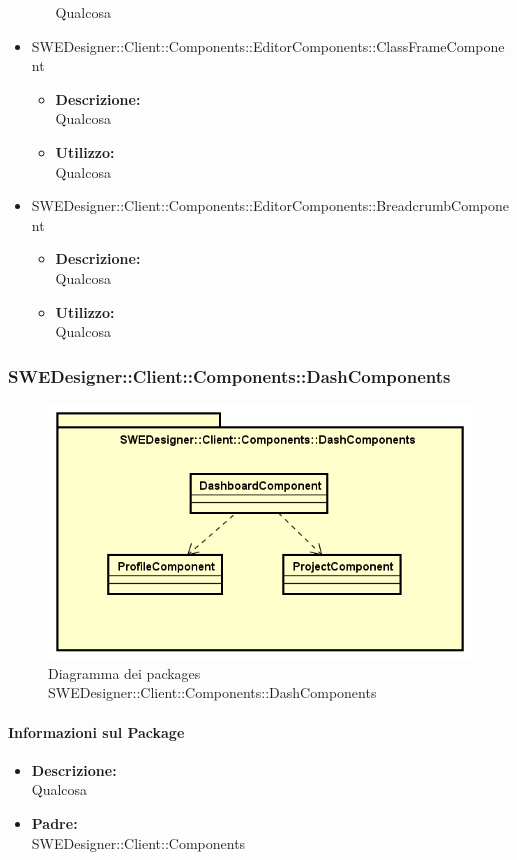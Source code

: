 \begin{itemize}
\begin{itemize}
				Qualcosa
			\end{itemize}
			\item SWEDesigner::Client::Components::EditorComponents::ClassFrameComponent
			\begin{itemize}
				\item \textbf{Descrizione: }\\
				Qualcosa
				\item \textbf{Utilizzo: }\\
				Qualcosa
			\end{itemize}
			\item SWEDesigner::Client::Components::EditorComponents::BreadcrumbComponent
			\begin{itemize}
				\item \textbf{Descrizione: }\\
				Qualcosa
				\item \textbf{Utilizzo: }\\
				Qualcosa
			\end{itemize}
			\end{itemize}
			
		\subsubsection{SWEDesigner::Client::Components::DashComponents}
		 \begin{figure}[h!]
		\centering
		\includegraphics[scale=0.4]{Disegnetti/SWEDesigner__Client__Components__DashComponents.png}
		\caption{Diagramma dei packages SWEDesigner::Client::Components::DashComponents}
 		\end{figure}
		\paragraph{Informazioni sul Package}
		\begin{itemize}				
			\item \textbf{Descrizione: }\\
			Qualcosa
			\item \textbf{Padre: }\\ SWEDesigner::Client::Components
		\end{itemize}
		
